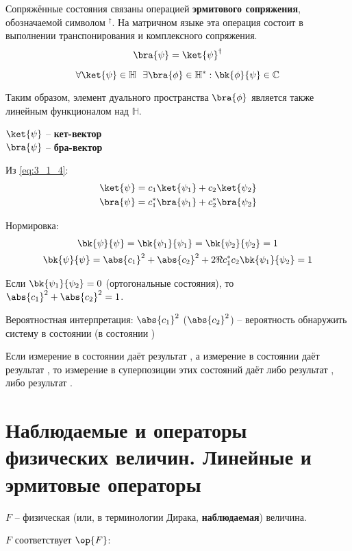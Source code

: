 Сопряжённые состояния связаны операцией \textbf{эрмитового сопряжения}, обозначаемой символом $^\dag$. На матричном языке эта операция состоит в выполнении транспонирования и комплексного сопряжения.
$$
\bra{\psi} = \ket{\psi}^\dag
$$

$$
\forall \ket{\psi} \in \mathbb{H}~~ \exists \bra{\phi} \in \mathbb{H}^* : \bk{\phi}{\psi} \in \mathbb{C}
$$

Таким образом, элемент дуального пространства $\bra{\phi}$ является также линейным функционалом над $\mathbb{H}$.

\noindent
$\ket{\psi}$ -- \textbf{кет-вектор} \\
$\bra{\psi}$ -- \textbf{бра-вектор}

Из \eqref{eq:3_1_4}:
$$
\begin{gathered}
\ket{\psi} = c_1 \ket{\psi_1} + c_2 \ket{\psi_2} \\
\bra{\psi} = c_1^* \bra{\psi_1} + c_2^* \bra{\psi_2}
\end{gathered}
$$

Нормировка:
$$
\begin{gathered}
\bk{\psi}{\psi} = \bk{\psi_1}{\psi_1} = \bk{\psi_2}{\psi_2} = 1 \\
\bk{\psi}{\psi} = \abs{c_1}^2 + \abs{c_2}^2 + 2 \Re{c_1^* c_2 \bk{\psi_1}{\psi_2}} = 1
\end{gathered}
$$

Если $\bk{\psi_1}{\psi_2} = 0$ (ортогональные состояния), то $\abs{c_1}^2 + \abs{c_2}^2 = 1$.

Вероятностная интерпретация: $\abs{c_1}^2$ ($\abs{c_2}^2$) -- вероятность обнаружить систему в состоянии  (в состоянии )

\begin{stmt}
Если измерение в состоянии  даёт результат , а измерение в состоянии  даёт результат , то измерение в суперпозиции этих состояний даёт либо результат , либо результат .
\end{stmt}

\section{Наблюдаемые и операторы физических величин. Линейные и эрмитовые операторы}

$F$ -- физическая (или, в терминологии Дирака, \textbf{наблюдаемая}) величина.

$F$ соответствует $\op{F}$:

